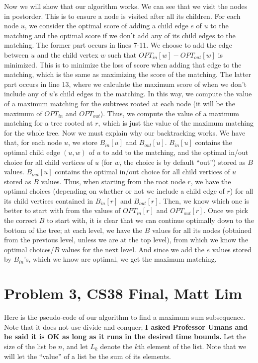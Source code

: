 \documentclass{article}
\begin{document}
Now we will show that our algorithm works. We can see that we visit the nodes in
postorder. This is to ensure a node is visited after all its children. For each
node $u$, we consider the optimal score of adding a child edge $e$ of $u$
to the matching and the optimal score if we don't add any of its child
edges to the matching. The former part occurs in lines 7-11. We choose to add
the edge between $u$ and the child vertex $w$ such that $OPT_{in}[w] -
OPT_{out}[w]$ is minimized.
This is to minimize the loss of score when adding that edge to the
matching, which is the same as maximizing the score of the matching.
The latter part occurs in line 13, where we calculate the maximum score of when
we don't include any of $u$'s child edges in the matching. In this way, we
compute the value of a maximum matching for the subtrees rooted at each node (it
will be the maximum of $OPT_{in}$ and $OPT_{out}$).
Thus, we compute the value of a maximum matching for a tree rooted at $r$, which
is just the value of the maximum matching for the whole tree. Now we must
explain why our backtracking works. We have that, for each node $u$, we store
$B_{in}[u]$ and $B_{out}[u]$. $B_{in}[u]$ contains the optimal child edge
$(u,w)$ of $u$ to add to the matching, and the optimal in/out choice for all child vertices of
$u$ (for $w$, the choice is by default ``out'') stored as $B$ values. $B_{out}[u]$ contains the
optimal in/out choice for all child vertices of $u$ stored as $B$ values. Thus, when starting from the
root node $r$, we have the optimal choices (depending on whether or not we
include a child edge of $r$) for all its child vertices contained
in $B_{in}[r]$ and $B_{out}[r]$. Then, we know which one is better to start with from the values
of $OPT_{in}[r]$ and $OPT_{out}[r]$. Once we pick the correct $B$ to start with,
it is clear that we can continue optimally down to the bottom of the
tree; at each level, we have the $B$ values for all its nodes
(obtained from the previous level, unless we are at the top level),
from which we know the optimal choices/$B$
values for the next level. And since we add the $e$ values stored by $B_{in}$'s,
which we know are optimal, we get the maximum matching.
\newpage

\section*{Problem 3, CS38 Final, Matt Lim}
Here is the pseudo-code of our algorithm to find a maximum sum subsequence. Note
that it does not use divide-and-conquer; \textbf{I asked Professor Umans and he said it
is OK as long as it runs in the desired time bounds.} Let the size of the
list be $n$, and let $L_k$ denote the $k$th element of the list.
Note that we will let the ``value'' of a list be the sum of its elements.
\end{document}
